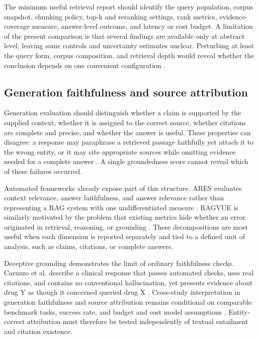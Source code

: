 \documentclass[a4paper,11pt]{article}
\begin{document}
The minimum useful retrieval report should identify the query population, corpus snapshot, chunking policy, top-k and reranking settings, rank metrics, evidence-coverage measure, answer-level outcome, and latency or cost budget. A limitation of the present comparison is that several findings are available only at abstract level, leaving some controls and uncertainty estimates unclear. Perturbing at least the query form, corpus composition, and retrieval depth would reveal whether the conclusion depends on one convenient configuration \citep{Taiwo2026Evaluating,Kovalskii2026Domain,Sauc2026Multimodal}.
\subsection{Generation faithfulness and source attribution}


Generation evaluation should distinguish whether a claim is supported by the supplied context, whether it is assigned to the correct source, whether citations are complete and precise, and whether the answer is useful. These properties can disagree: a response may paraphrase a retrieved passage faithfully yet attach it to the wrong entity, or it may cite appropriate sources while omitting evidence needed for a complete answer \citep{Nematov2025Source,Caruzzo2026Deceptive}. A single groundedness score cannot reveal which of these failures occurred.

Automated frameworks already expose part of this structure. ARES evaluates context relevance, answer faithfulness, and answer relevance rather than representing a RAG system with one undifferentiated measure \citep{SaadFalcon2023Ares}. RAGVUE is similarly motivated by the problem that existing metrics hide whether an error originated in retrieval, reasoning, or grounding \citep{Murugaraj2025Ragvue}. These decompositions are most useful when each dimension is reported separately and tied to a defined unit of analysis, such as claims, citations, or complete answers.

Deceptive grounding demonstrates the limit of ordinary faithfulness checks. Caruzzo et al. describe a clinical response that passes automated checks, uses real citations, and contains no conventional hallucination, yet presents evidence about drug Y as though it concerned queried drug X \citep{Caruzzo2026Deceptive}. Cross-study interpretation in generation faithfulness and source attribution remains conditional on comparable benchmark tasks, success rate, and budget and cost model assumptions \citep{Caruzzo2026Deceptive}. Entity-correct attribution must therefore be tested independently of textual entailment and citation existence.
\end{document}
